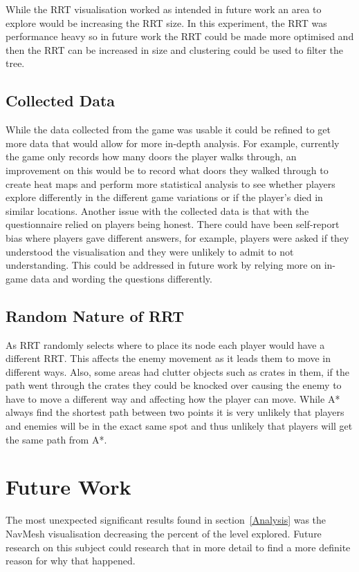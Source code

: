 \documentclass[journal]{IEEEtran}
\begin{document}
	While the RRT visualisation worked as intended in future work an area to explore would be increasing the RRT size.  In this experiment, the RRT was performance heavy so in future work the RRT could be made more optimised and then the RRT can be increased in size and clustering could be used to filter the tree.
	
	\subsection{Collected Data}    
	While the data collected from the game was usable it could be refined to get more data that would allow for more in-depth analysis. For example, currently the game only records how many doors the player walks through, an improvement on this would be to record what doors they walked through to create heat maps and perform more statistical analysis to see whether players explore differently in the different game variations or if the player's died in similar locations.
	Another issue with the collected data is that with the questionnaire relied on players being honest. There could have been self-report bias where players gave different answers, for example, players were asked if they understood the visualisation and they were unlikely to admit to not understanding. This could be addressed in future work by relying more on in-game data and wording the questions differently.
	
	\subsection{Random Nature of RRT}
	As RRT randomly selects where to place its node each player would have a different RRT. This affects the enemy movement as it leads them to move in different ways. Also, some areas had clutter objects such as crates in them, if the path went through the crates they could be knocked over causing the enemy to have to move a different way and affecting how the player can move. 
	While A* always find the shortest path between two points it is very unlikely that players and enemies will be in the exact same spot and thus unlikely that players will get the same path from A*. 
	
	
	\section{Future Work} \label{FutureWork}
	The most unexpected significant results found in section~\ref{Analysis} was the NavMesh visualisation decreasing the percent of the level explored. Future research on this subject could research that in more detail to find a more definite reason for why that happened. 
	
\end{document}
